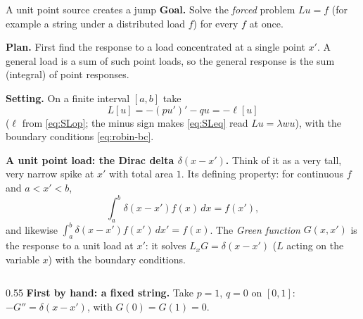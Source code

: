 \documentclass[11pt]{beamer}
\begin{document}
\begin{frame}[allowframebreaks=1.00]{A unit point source creates a jump}
\footnotesize
\textbf{Goal.} Solve the \emph{forced} problem \(Lu=f\) (for example a string under a distributed load
\(f\)) for every \(f\) at once.

\textbf{Plan.} First find the response to a load concentrated at a single point \(x'\). A general load
is a sum of such point loads, so the general response is the sum (integral) of point responses.

\textbf{Setting.} On a finite interval \([a,b]\) take
\[
 L[u]=-(pu')'-qu=-\ell[u]
\]
(\(\ell\) from \eqref{eq:SLop}; the minus sign makes \eqref{eq:SLeq} read \(Lu=\lambda wu\)), with the boundary conditions
\eqref{eq:robin-bc}.

\textbf{A unit point load: the Dirac delta \(\delta(x-x')\).} Think of it as a very tall, very narrow spike
at \(x'\) with total area \(1\). Its defining property: for continuous \(f\) and \(a<x'<b\),
\[
 \int_a^b\delta(x-x')f(x)\,dx=f(x'),
\]
and likewise \(\int_a^b\delta(x-x')f(x')\,dx'=f(x)\). The \emph{Green function} \(G(x,x')\) is the response to a
unit load at \(x'\): it solves \(L_xG=\delta(x-x')\) (\(L\) acting on the variable \(x\)) with the boundary
conditions.
\par\framebreak\par
\begin{columns}[T]
\begin{column}{0.55\textwidth}
\footnotesize
\textbf{First by hand: a fixed string.} Take \(p=1\), \(q=0\) on \([0,1]\): \(-G''=\delta(x-x')\), with
\(G(0)=G(1)=0\).


\end{column}
\end{columns}
\end{frame}
\end{document}

